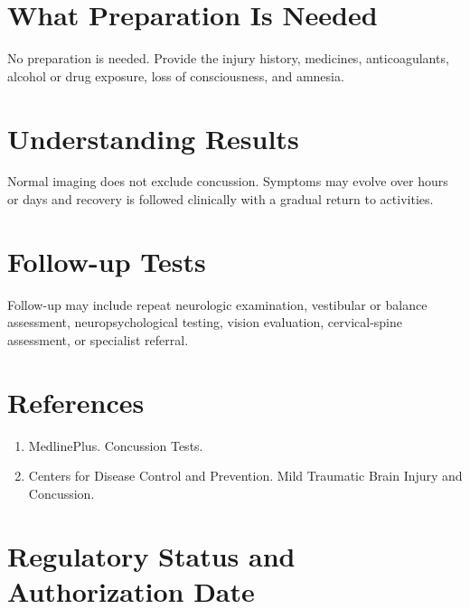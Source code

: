 \section*{What Preparation Is Needed}
No preparation is needed. Provide the injury history, medicines, anticoagulants, alcohol or drug exposure, loss of consciousness, and amnesia.
\section*{Understanding Results}
Normal imaging does not exclude concussion. Symptoms may evolve over hours or days and recovery is followed clinically with a gradual return to activities.
\section*{Follow-up Tests}
Follow-up may include repeat neurologic examination, vestibular or balance assessment, neuropsychological testing, vision evaluation, cervical-spine assessment, or specialist referral.
\section*{References}
\begin{enumerate}\item MedlinePlus. Concussion Tests.\item Centers for Disease Control and Prevention. Mild Traumatic Brain Injury and Concussion.\end{enumerate}
\clearpage
\section*{Regulatory Status and Authorization Date}\clearpage
